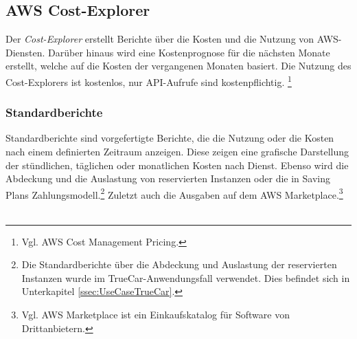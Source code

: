 \subsection{AWS Cost-Explorer}\label{ssec:Cost-Explorer}
Der \textit{Cost-Explorer} erstellt Berichte über die Kosten und die Nutzung von AWS-Diensten. Darüber hinaus wird eine Kostenprognose für die nächsten Monate erstellt, welche auf die Kosten der vergangenen Monaten basiert. Die Nutzung des Cost-Explorers ist kostenlos, nur API-Aufrufe sind kostenpflichtig. \footnote{Vgl. {AWS Cost Management Pricing\cite{AMZ22}.}}
\subsubsection*{Standardberichte}
Standardberichte sind vorgefertigte Berichte, die die Nutzung oder die Kosten nach einem definierten Zeitraum anzeigen. Diese zeigen eine grafische Darstellung der stündlichen, täglichen oder monatlichen Kosten nach Dienst. Ebenso wird die Abdeckung und die Auslastung von reservierten Instanzen oder die in Saving Plans Zahlungsmodell.\footnote{Die Standardberichte über die Abdeckung und Auslastung der reservierten Instanzen wurde im TrueCar-Anwendungsfall verwendet. Dies befindet sich in Unterkapitel \ref{ssec:UseCaseTrueCar}.} Zuletzt auch die Ausgaben auf dem AWS Marketplace.\footnote{Vgl. {AWS Marketplace ist ein Einkaufskatalog für Software von Drittanbietern\cite{AMZ34}.}} 
\\\\
